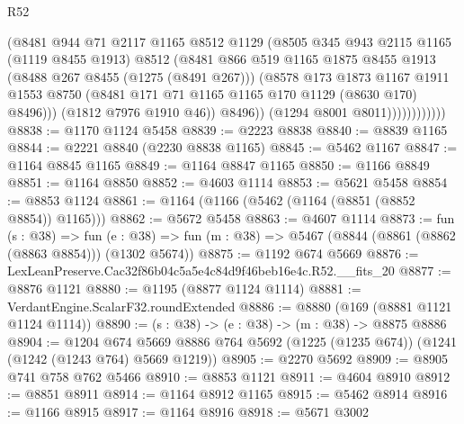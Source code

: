 \begin{lexlean}{R52}
\begin{coremodule}
                            (@8481
                              @944
                              @71
                              @2117
                              @1165
                              @8512
                              @1129
                              (@8505
                                @345
                                @943
                                @2115
                                @1165
                                (@1119 @8455 @1913)
                                @8512
                                (@8481
                                  @866
                                  @519
                                  @1165
                                  @1875
                                  @8455
                                  @1913
                                  (@8488 @267 @8455 (@1275 (@8491 @267)))
                                  (@8578
                                    @173
                                    @1873
                                    @1167
                                    @1911
                                    @1553
                                    @8750
                                    (@8481 @171 @71 @1165 @1165 @170 @1129 (@8630 @170) @8496)))
                                (@1812 @7976 @1910 @46))
                              @8496))
                          (@1294 @8001 @8011))))))))))))
@8838 := @1170 @1124 @5458
@8839 := @2223 @8838
@8840 := @8839 @1165
@8844 := @2221 @8840 (@2230 @8838 @1165)
@8845 := @5462 @1167
@8847 := @1164 @8845 @1165
@8849 := @1164 @8847 @1165
@8850 := @1166 @8849
@8851 := @1164 @8850
@8852 := @4603 @1114
@8853 := @5621 @5458
@8854 := @8853 @1124
@8861 := @1164 (@1166 (@5462 (@1164 (@8851 (@8852 @8854)) @1165)))
@8862 := @5672 @5458
@8863 := @4607 @1114
@8873 := fun (s : @38) =>
  fun (e : @38) => fun (m : @38) => @5467 (@8844 (@8861 (@8862 (@8863 @8854))) (@1302 @5674))
@8875 := @1192 @674 @5669
@8876 := LexLeanPreserve.Cac32f86b04c5a5e4c84d9f46beb16e4c.R52.__fits_20
@8877 := @8876 @1121
@8880 := @1195 (@8877 @1124 @1114)
@8881 := VerdantEngine.ScalarF32.roundExtended
@8886 := @8880 (@169 (@8881 @1121 @1124 @1114))
@8890 := (s : @38) -> (e : @38) -> (m : @38) -> @8875 @8886
@8904 := @1204
    @674
    @5669
    @8886
    @764
    @5692
    (@1225 (@1235 @674))
    (@1241 (@1242 (@1243 @764) @5669 @1219))
@8905 := @2270 @5692
@8909 := @8905 @741 @758 @762 @5466
@8910 := @8853 @1121
@8911 := @4604 @8910
@8912 := @8851 @8911
@8914 := @1164 @8912 @1165
@8915 := @5462 @8914
@8916 := @1166 @8915
@8917 := @1164 @8916
@8918 := @5671 @3002

\end{coremodule}
\end{lexlean}
